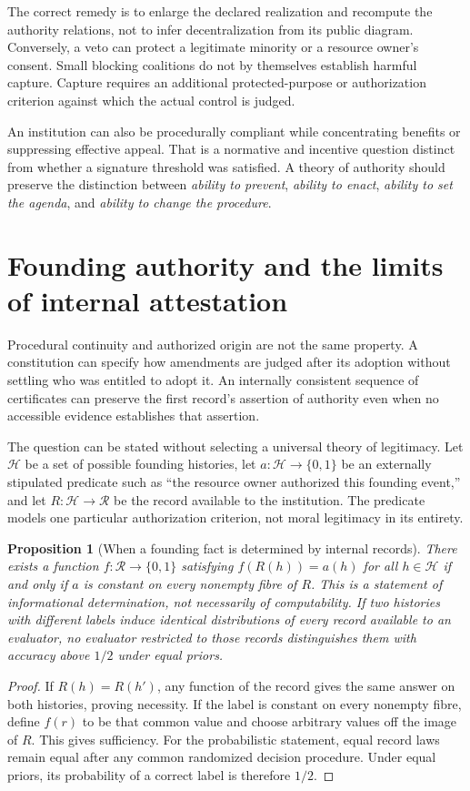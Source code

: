 \documentclass[11pt,letterpaper]{article}
\theoremstyle{plain}
\newtheorem{proposition}{Proposition}[section]
\theoremstyle{definition}
\theoremstyle{remark}
\begin{document}
The correct remedy is to enlarge the declared realization and recompute the authority relations, not to infer decentralization from its public diagram. Conversely, a veto can protect a legitimate minority or a resource owner's consent. Small blocking coalitions do not by themselves establish harmful capture. Capture requires an additional protected-purpose or authorization criterion against which the actual control is judged.

An institution can also be procedurally compliant while concentrating benefits or suppressing effective appeal. That is a normative and incentive question distinct from whether a signature threshold was satisfied. A theory of authority should preserve the distinction between \emph{ability to prevent}, \emph{ability to enact}, \emph{ability to set the agenda}, and \emph{ability to change the procedure}.

\section{Founding authority and the limits of internal attestation}\label{sec:founding}
Procedural continuity and authorized origin are not the same property. A constitution can specify how amendments are judged after its adoption without settling who was entitled to adopt it. An internally consistent sequence of certificates can preserve the first record's assertion of authority even when no accessible evidence establishes that assertion.

The question can be stated without selecting a universal theory of legitimacy. Let $\mathcal H$ be a set of possible founding histories, let $a:\mathcal H\to\{0,1\}$ be an externally stipulated predicate such as ``the resource owner authorized this founding event,'' and let $R:\mathcal H\to\mathcal R$ be the record available to the institution. The predicate models one particular authorization criterion, not moral legitimacy in its entirety.

\begin{proposition}[When a founding fact is determined by internal records]\label{prop:founding}
There exists a function $f:\mathcal R\to\{0,1\}$ satisfying $f(R(h))=a(h)$ for all $h\in\mathcal H$ if and only if $a$ is constant on every nonempty fibre of $R$. This is a statement of informational determination, not necessarily of computability. If two histories with different labels induce identical distributions of every record available to an evaluator, no evaluator restricted to those records distinguishes them with accuracy above $1/2$ under equal priors.
\end{proposition}
\begin{proof}
If $R(h)=R(h')$, any function of the record gives the same answer on both histories, proving necessity. If the label is constant on every nonempty fibre, define $f(r)$ to be that common value and choose arbitrary values off the image of $R$. This gives sufficiency. For the probabilistic statement, equal record laws remain equal after any common randomized decision procedure. Under equal priors, its probability of a correct label is therefore $1/2$.
\end{proof}
\end{document}
